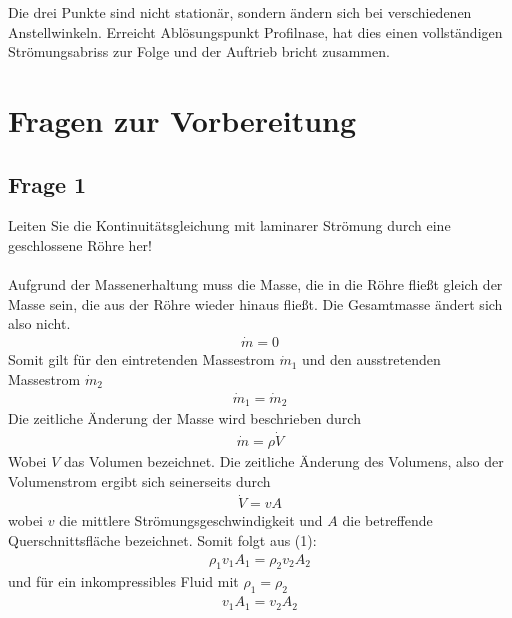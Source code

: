 \documentclass[a4paper,10pt]{scrartcl}
\begin{document}
				Die drei Punkte sind nicht stationär, sondern ändern sich bei verschiedenen Anstellwinkeln. Erreicht Ablösungspunkt Profilnase, hat dies einen vollständigen Strömungsabriss zur Folge und der Auftrieb bricht zusammen.
		
	\section{Fragen zur Vorbereitung}
		\subsection{Frage 1}
			Leiten Sie die Kontinuitätsgleichung mit laminarer Strömung durch eine geschlossene Röhre
			her!\\
			\\
			Aufgrund der Massenerhaltung muss die Masse, die in die Röhre fließt gleich der Masse sein, die aus der Röhre wieder hinaus fließt. Die Gesamtmasse ändert sich also nicht.
			\begin{align*}
			\dot m=0
			\end{align*}
			Somit gilt für den eintretenden Massestrom \(\dot m_{1}\) und den ausstretenden Massestrom \(\dot m_{2}\)
			\begin{align}
			\dot m_{1}=\dot m_{2}
			\end{align}
			Die zeitliche Änderung der Masse wird beschrieben durch 
			\begin{align*}
			\dot m=\rho \dot V
			\end{align*}
			Wobei \(V\) das Volumen bezeichnet. Die zeitliche Änderung des Volumens, also der Volumenstrom ergibt sich seinerseits durch
			\begin{align*}
			\dot V=vA
			\end{align*}
			wobei \(v\) die mittlere Strömungsgeschwindigkeit und \(A\) die betreffende Querschnittsfläche bezeichnet. Somit folgt aus (1):
			\begin{align*}
			\rho_{1}v_{1}A_{1}=\rho_{2}v_{2}A_{2}
			\end{align*}
			und für ein inkompressibles Fluid mit \(\rho_{1}=\rho_{2}\)
			\begin{align*}
			v_{1}A_{1}=v_{2}A_{2}
			\end{align*}
			
\end{document}
